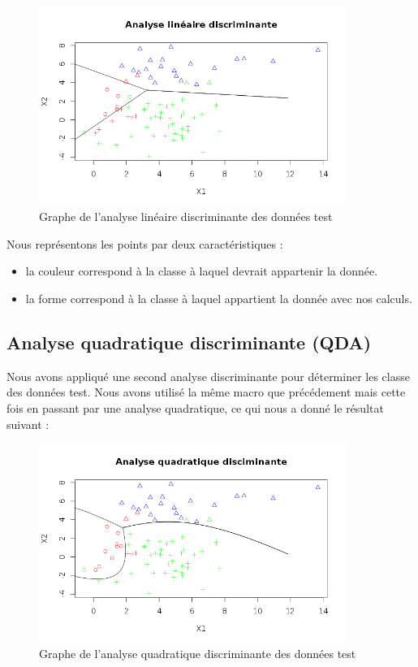 \documentclass[a4paper,11pt]{article}
\begin{document}
  \begin{figure}[h]
   \center
   \includegraphics[width=10cm]{lineaire_discri.png}
   \caption{Graphe de l'analyse linéaire discriminante des données test}
  \end{figure}
  
  Nous représentons les points par deux caractéristiques :
  \begin{itemize}
   \item la couleur correspond à la classe à laquel devrait appartenir la donnée.
   \item la forme correspond à la classe à laquel appartient la donnée avec nos calculs.
  \end{itemize}
  
  \subsection{Analyse quadratique discriminante (QDA)}
  
  Nous avons appliqué une second analyse discriminante pour déterminer les classe des données test.
  Nous avons utilisé la même macro que précédement mais cette fois en passant par une analyse quadratique, 
  ce qui nous a donné le résultat suivant :\\
  
  \begin{figure}[h]
   \center
   \includegraphics[width=10cm]{quadratique.png}
   \caption{Graphe de l'analyse quadratique discriminante des données test}
  \end{figure}
  
\end{document}
